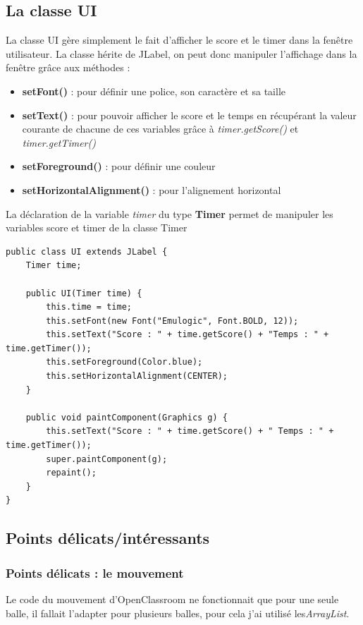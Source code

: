 \documentclass{article}
\begin{document}
\newpage
\subsection{La classe UI}
La classe UI gère simplement le fait d'afficher le score et le timer dans la fenêtre utilisateur. La classe hérite de JLabel, on peut donc manipuler l'affichage dans la fenêtre grâce aux méthodes :
\begin{itemize}
	\item \textbf{setFont()} : pour définir une police, son caractère et sa taille
	\item \textbf{setText()} : pour pouvoir afficher le score et le temps en récupérant la valeur courante de chacune de ces variables grâce à \textit{timer.getScore()} et \textit{timer.getTimer()}
	\item \textbf{setForeground()} : pour définir une couleur
	\item \textbf{setHorizontalAlignment()} : pour l'alignement horizontal
\end{itemize}

\vspace{5mm}

 La déclaration de la variable \textit{timer} du type \textbf{Timer} permet de manipuler les variables score et timer de la classe Timer

\begin{verbatim}
public class UI extends JLabel {
    Timer time;
    
    public UI(Timer time) {
	    this.time = time;
	    this.setFont(new Font("Emulogic", Font.BOLD, 12));
	    this.setText("Score : " + time.getScore() + "Temps : " + time.getTimer());
	    this.setForeground(Color.blue);
	    this.setHorizontalAlignment(CENTER);
    }
	
    public void paintComponent(Graphics g) {
        this.setText("Score : " + time.getScore() + " Temps : " + time.getTimer());
        super.paintComponent(g);
        repaint();
    }
}
\end{verbatim}


\subsection{Points délicats/intéressants}
\subsubsection{Points délicats : le mouvement} Le code du mouvement d'OpenClassroom ne fonctionnait que pour une seule balle, il fallait l'adapter pour plusieurs balles, pour cela j'ai utilisé les\textit{ArrayList}.
\end{document}
